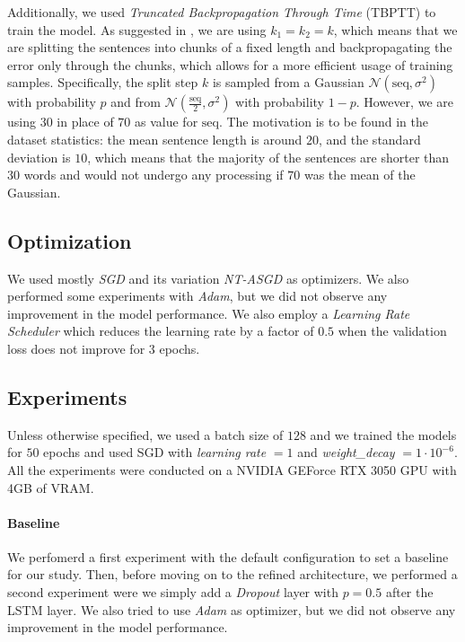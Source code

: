Additionally, we used \emph{Truncated Backpropagation Through Time} (TBPTT) to train the model. As suggested in \cite{merity2017regularizing}, we are using $k_1 = k_2 = k$, which means that we are splitting the sentences into chunks of a fixed length and backpropagating the error only through the chunks, which allows for a more efficient usage of training samples. Specifically, the split step $k$ is sampled from a Gaussian $\mathcal{N}(\textrm{seq}, \sigma^2)$ with probability $p$ and from $\mathcal{N}(\frac{\textrm{seq}}{2}, \sigma^2)$ with probability $1-p$. However, we are using $30$ in place of $70$ as value for $\textrm{seq}$. The motivation is to be found in the dataset statistics: the mean sentence length is around $20$, and the standard deviation is $10$, which means that the majority of the sentences are shorter than $30$ words and would not undergo any processing if $70$ was the mean of the Gaussian.

\subsection{Optimization}
We used mostly \emph{SGD} and its variation \emph{NT-ASGD}\cite{merity2017regularizing} as optimizers. We also performed some experiments with \emph{Adam}, but we did not observe any improvement in the model performance. We also employ a \emph{Learning Rate Scheduler} which reduces the learning rate by a factor of $0.5$ when the validation loss does not improve for $3$ epochs.

\subsection{Experiments}
Unless otherwise specified, we used a batch size of $128$ and we trained the models for $50$ epochs and used SGD with \emph{learning rate} $= 1$ and \emph{weight_decay} $=1\cdot 10^{-6}$. All the experiments were conducted on a NVIDIA GEForce RTX 3050 GPU with 4GB of VRAM.
\paragraph*{Baseline} 
We perfomerd a first experiment with the default configuration to set a baseline for our study. Then, before moving on to the refined architecture, we performed a second experiment were we simply add a \emph{Dropout} layer with $p=0.5$ after the LSTM layer. We also tried to use \emph{Adam} as optimizer, but we did not observe any improvement in the model performance.
